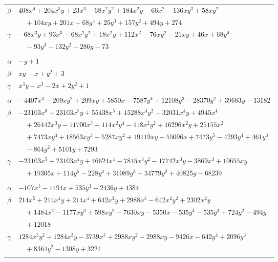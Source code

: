 \documentclass[11pt]{article}
\begin{document}
\begin{longtable}{@{}ll@{}}
$\beta$ & $408x^{4}+204x^{3}y+23x^{3}-68x^{2}y^{2}+184x^{2}y-66x^{2}-136xy^{3}+58xy^{2}$\\
 & $\quad +104xy+201x-68y^{4}+25y^{3}+157y^{2}+494y+274$\\
$\gamma$ & $-68x^{3}y+93x^{3}-68x^{2}y^{2}+18x^{2}y+112x^{2}-76xy^{2}-21xy+46x+68y^{4}$\\
 & $\quad -93y^{3}-132y^{2}-286y-73$\\
\addlinespace[3pt]
\multicolumn{2}{@{}l}{$\{i,j\}=\{5,30\}$, $k_{ij}=1$}\\
$\alpha$ & $-y+1$\\
$\beta$ & $xy-x+y^{2}+3$\\
$\gamma$ & $x^{3}y-x^{3}-2x+2y^{2}+1$\\
\addlinespace[3pt]
\multicolumn{2}{@{}l}{$\{i,j\}=\{5,47\}$, $k_{ij}=3^{2}\cdot 5^{2}\cdot 7\cdot 13$}\\
$\alpha$ & $-4407x^{3}-209xy^{2}+209xy+5850x-7587y^{4}+12108y^{3}-28370y^{2}+39683y-13182$\\
$\beta$ & $-23103x^{6}+23103x^{5}y+55438x^{5}+15288x^{4}y^{2}-32031x^{4}y+4945x^{4}$\\
 & $\quad +26442x^{3}y-11700x^{3}-114x^{2}y^{4}-418x^{2}y^{2}+16296x^{2}y+25155x^{2}$\\
 & $\quad +7473xy^{4}+18563xy^{3}-5287xy^{2}+19119xy-55096x+7473y^{5}-4293y^{4}+461y^{3}$\\
 & $\quad -864y^{2}+5101y+7293$\\
$\gamma$ & $-23103x^{5}+23103x^{4}y+46624x^{4}-7815x^{3}y^{2}-17742x^{3}y-3869x^{3}+10655xy$\\
 & $\quad +19305x+114y^{5}-228y^{4}+31089y^{3}-34779y^{2}+40825y-68239$\\
\addlinespace[3pt]
\multicolumn{2}{@{}l}{$\{i,j\}=\{5,57\}$, $k_{ij}=2\cdot 3^{2}\cdot 5\cdot 7^{2}$}\\
$\alpha$ & $-107x^{3}-1494x+535y^{3}-2436y+4384$\\
$\beta$ & $214x^{5}+214x^{4}y+214x^{4}+642x^{3}y+2988x^{3}-642x^{2}y^{2}+2302x^{2}y$\\
 & $\quad +1484x^{2}-1177xy^{3}+598xy^{2}+7630xy-5350x-535y^{4}-535y^{3}+724y^{2}-494y$\\
 & $\quad +12018$\\
$\gamma$ & $1284x^{3}y^{2}+1284x^{3}y-3739x^{3}+2988xy^{2}-2988xy-9426x-642y^{4}+2096y^{3}$\\
 & $\quad +8364y^{2}-1308y+3224$\\
\addlinespace[3pt]
\multicolumn{2}{@{}l}{$\{i,j\}=\{5,70\}$, $k_{ij}=3\cdot 5^{2}$}\\

\end{longtable}
\end{document}
